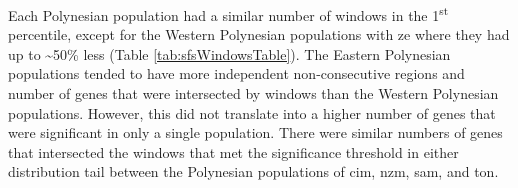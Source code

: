 \documentclass[twoside,openright]{report}
\begin{document}
Each Polynesian population had a similar number of windows in the
1\textsuperscript{st} percentile, except for the Western Polynesian
populations with \gls{ze} where they had up to \textasciitilde{}50\%
less (Table \ref{tab:sfsWindowsTable}). The Eastern Polynesian
populations tended to have more independent non-consecutive regions and
number of genes that were intersected by windows than the Western
Polynesian populations. However, this did not translate into a higher
number of genes that were significant in only a single population. There
were similar numbers of genes that intersected the windows that met the
significance threshold in either distribution tail between the
Polynesian populations of \gls{cim}, \gls{nzm}, \gls{sam}, and
\gls{ton}.

\begin{table}


\end{table}
\end{document}

